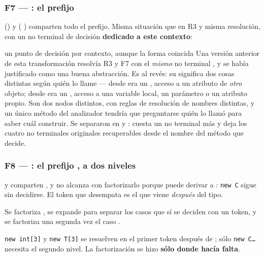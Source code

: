 \subsubsection{F7 --- : el prefijo }

 () y  ( ) comparten
todo el prefijo. Misma situación que en R3 y misma resolución, con un no terminal de decisión
\textbf{dedicado a este contexto}:
\begin{producciones}
\end{producciones}

\begin{decision}{un punto de decisión por contexto, aunque la forma coincida}
Una versión anterior de esta transformación resolvía R3 y F7 con el \emph{mismo} no terminal
, y se había justificado como una buena abstracción. Es al revés: su
\eps{} significa dos cosas distintas según quién lo llame --- desde  era un
, acceso a un atributo de \emph{otro} objeto; desde 
era un , acceso a una variable local, un parámetro o un atributo propio. Son dos
nodos distintos, con reglas de resolución de nombres distintas, y un único método del analizador
tendría que preguntarse quién lo llamó para saber cuál construir. Se separaron en
 y : cuesta un no terminal más y deja los cuatro
no terminales originales recuperables desde el nombre del método que decide.
\end{decision}

\subsubsection{F8 --- : el prefijo , a dos niveles}

  y  comparten , y no alcanza con
factorizarlo porque  puede derivar a : \texttt{new C} sigue sin
decidirse. El token que desempata es el que viene \emph{después} del tipo.

 Se factoriza , se expande  para separar los casos que
sí se deciden con un token, y se factoriza una segunda vez el caso .
\begin{producciones}
\end{producciones}
\texttt{new int[3]} y \texttt{new T[3]} se resuelven en el primer token después de ;
sólo \texttt{new C\dots} necesita el segundo nivel. La factorización se hizo \textbf{sólo donde
hacía falta}.

